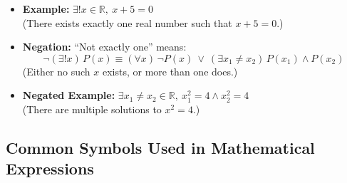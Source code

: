 \begin{description}[leftmargin=1.5cm, labelindent=1cm, style=sameline]
		\begin{itemize}
			\item \textbf{Example:} \quad $\exists! x \in \mathbb{R},\ x + 5 = 0$ \\
			      (There exists exactly one real number such that \( x + 5 = 0 \).)

			\item \textbf{Negation:} \quad ``Not exactly one'' means:
			      \[
				      \neg (\exists! x)\, P(x) \equiv (\forall x)\, \neg P(x)\ \lor\ (\exists x_1 \neq x_2)\, P(x_1) \land P(x_2)
			      \]
			      (Either no such \( x \) exists, or more than one does.)

			\item \textbf{Negated Example:} \quad $\exists x_1 \neq x_2 \in \mathbb{R},\ x_1^2 = 4 \land x_2^2 = 4$ \\
			      (There are multiple solutions to \( x^2 = 4 \).)
		\end{itemize}

\end{description}

\subsection{Common Symbols Used in Mathematical Expressions}


